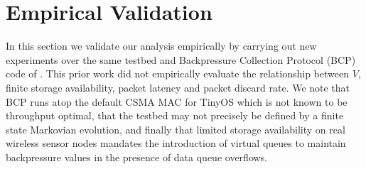 \documentclass[journal]{IEEEtran}
\newcommand{\expect}[1]{\mathbb{E}\big\{#1\big\}}
\begin{document}







\vspace{-.05in}

\section{Empirical Validation}\label{section:experiment}
In this section we validate our analysis empirically by carrying out new experiments over the same testbed and Backpressure Collection Protocol (BCP) code of  \cite{scott_lifo_ipsn}.  This prior work did not empirically evaluate the relationship between $V$, finite storage availability, packet latency and packet discard rate.  We note that BCP runs atop the default CSMA MAC for TinyOS which is not known to be throughput optimal, that the testbed may not precisely be defined by a finite state Markovian evolution, and finally that limited storage availability on real wireless sensor nodes mandates the introduction of virtual queues to maintain backpressure values in the presence of data queue overflows.
\end{document}
